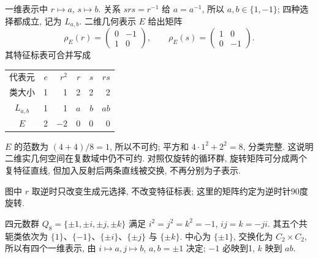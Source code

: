 一维表示中 $r\mapsto a$, $s\mapsto b$. 关系 $srs=r^{-1}$ 给 $a=a^{-1}$, 所以 $a,b\in\{1,-1\}$; 四种选择都成立, 记为 $L_{a,b}$. 二维几何表示 $E$ 给出矩阵
\[
 \rho_E(r)=\begin{pmatrix}0&-1\\1&0\end{pmatrix},\qquad
 \rho_E(s)=\begin{pmatrix}1&0\\0&-1\end{pmatrix}.
\]
其特征标表可合并写成
\begin{center}
\begin{tabular}{c|rrrrr}
\toprule
代表元 &$e$&$r^2$&$r$&$s$&$rs$\\
类大小 &1&1&2&2&2\\\midrule
$L_{a,b}$&1&1&$a$&$b$&$ab$\\
$E$&2&$-2$&0&0&0\\\bottomrule
\end{tabular}
\end{center}
$E$ 的范数为 $(4+4)/8=1$, 所以不可约; 平方和 $4\cdot1^2+2^2=8$, 分类完整. 这说明二维实几何空间在复数域中仍不可约. 对照仅旋转的循环群, 旋转矩阵可分成两个复特征直线, 但加入反射后两条直线被交换, 不再分别为子表示.

\begin{center}
\end{center}
图中 $r$ 取逆时只改变生成元选择, 不改变特征标表; 这里的矩阵约定为逆时针90度旋转.

四元数群 $Q_8=\{\pm1,\pm i,\pm j,\pm k\}$ 满足 $i^2=j^2=k^2=-1$, $ij=k=-ji$. 其五个共轭类依次为 $\{1\}$、$\{-1\}$、$\{\pm i\}$、$\{\pm j\}$ 与 $\{\pm k\}$. 中心为 $\{\pm1\}$, 交换化为 $C_2\times C_2$, 所以有四个一维表示, 由 $i\mapsto a,j\mapsto b$, $a,b=\pm1$ 决定; $-1$ 必映到1, $k$ 映到 $ab$.


